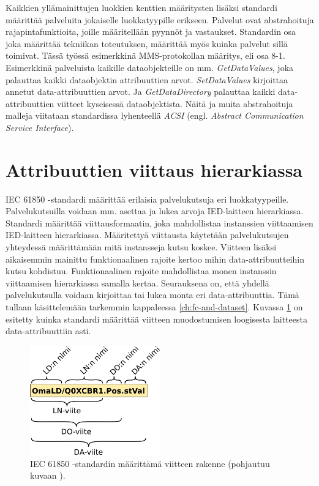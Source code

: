 Kaikkien yllämainittujen luokkien kenttien määritysten lisäksi standardi määrittää palveluita jokaiselle luokkatyypille erikseen. Palvelut ovat abstrahoituja rajapintafunktioita, joille määritellään pyynnöt ja vastaukset. Standardin osa joka määrittää tekniikan toteutuksen, määrittää myös kuinka palvelut sillä toimivat. Tässä työssä esimerkkinä MMS-protokollan määritys, eli osa 8-1. Esimerkkinä palveluista kaikille dataobjekteille on mm. \emph{GetDataValues}, joka palauttaa kaikki dataobjektin attribuuttien arvot. \emph{SetDataValues} kirjoittaa annetut data-att\-ri\-buut\-ti\-en arvot. Ja \emph{GetDataDirectory} palauttaa kaikki data-att\-ri\-buut\-ti\-en viitteet kyseisessä dataobjektista. Näitä ja muita abstrahoituja malleja viitataan standardissa lyhenteellä \emph{ACSI} (engl. \emph{Abstract Communication Service Interface}). \mbox{\cite[s.~15, 45--46]{IEC61850-7-2}} \mbox{\cite[s.~26]{IEC61850-7-1}}


\section{Attribuuttien viittaus hierarkiassa}
IEC 61850 -standardi määrittää erilaisia palvelukutsuja eri luokkatyypeille. Palvelukutsuilla voidaan mm. asettaa ja lukea arvoja IED-laitteen hierarkiassa. Standardi määrittää viittausformaatin, joka mahdollistaa instanssien viittaamisen IED-laitteen hierarkiassa. Määritettyä viittausta käytetään palvelukutsujen yhteydessä määrittämään mitä instansseja kutsu koskee. Viitteen lisäksi aikaisemmin mainittu funktionaalinen rajoite kertoo mihin data-attribuutteihin kutsu kohdistuu. Funktionaalinen rajoite mahdollistaa monen instanssin viittaamisen hierarkiassa samalla kertaa. Seurauksena on, että yhdellä palvelukutsulla voidaan kirjoittaa tai lukea monta eri data-attribuuttia. Tämä tullaan käsittelemään tarkemmin kappaleessa \ref{ch:fc-and-dataset}. Kuvassa \ref{fig:iec61850-data-reference} on esitetty kuinka standardi määrittää viitteen muodostumisen loogisesta laitteesta data-attribuuttiin asti. \mbox{\cite[s.~625--626]{Mackiewicz2006}}

\begin{figure}[ht!]
	\includegraphics[width=0.5\textwidth]{pictures/iec61850-data-reference.png}
	\caption{IEC 61850 -standardin määrittämä viitteen rakenne (pohjautuu kuvaan \mbox{\cite[s.~93]{IEC61850-7-1}}).}
	\label{fig:iec61850-data-reference}
\end{figure}


